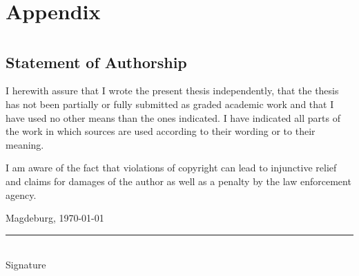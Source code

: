 \documentclass[
  12pt,
  a4paper,
  printlength,
  bibliography=totoc,
  chapterprefix,
  headings=openright,
  numbers=endperiod,
  parskip=half,
  twoside
]{scrreprt}
\begin{document}







\printbibliography


\appendix

\chapter{Appendix}
\label{cha:appendix}

\chapter*{}

\section*{Statement of Authorship}

I herewith assure that I wrote the present thesis independently, that the thesis has not been partially or fully submitted as graded academic work and that I have used no other means than the ones indicated.
I have indicated all parts of the work in which sources are used according to their wording or to their meaning.

I am aware of the fact that violations of copyright can lead to injunctive relief and claims for damages of the author as well as a penalty by the law enforcement agency.

\bigskip

Magdeburg, \today

\bigskip
\bigskip

\rule{0.5\textwidth}{0.5pt}\\
\hspace*{0.25em}Signature
\end{document}
